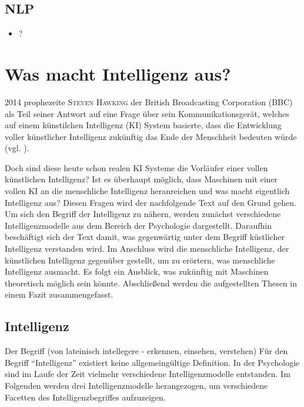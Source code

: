 \documentclass[a4paper, 11pt]{scrartcl}
\begin{document}
\subsection{NLP}
\begin{itemize}
  \item ?
\end{itemize}

\newpage

\section{Was macht Intelligenz aus?}

2014 prophezeite \textsc{Steven Hawking} der British Broadcasting Corporation (BBC) als Teil seiner Antwort auf eine Frage über sein Kommunikationsgerät, welches auf einem künstilchen Intelligenz (KI) System basierte, dass die Entwicklung voller künstlicher Intelligenz zukünftig das Ende der Menschheit bedeuten würde (vgl. \cite{BBC2014}).

Doch sind diese heute schon realen KI Systeme die Vorläufer einer vollen künstlichen Intelligenz? Ist es überhaupt möglich, dass Maschinen mit einer vollen KI an die menschliche Intelligenz heranreichen und was macht eigentlich Intelligenz aus? Diesen Fragen wird der nachfolgende Text auf den Grund gehen. Um sich den Begriff der Intelligenz zu nähern, werden zunächst verschiedene Intelligenzmodelle aus dem Bereich der Psychologie dargestellt. Daraufhin beschäftigt sich der Text damit, was gegenwärtig unter dem Begriff küstlicher Intelligenz verstanden wird. Im Anschluss wird die menschliche Intelligenz, der künstlichen Intelligenz gegenüber gestellt, um zu erörtern, was menschliche Intelligenz ausmacht. Es folgt ein Ausblick, was zukünftig mit Maschinen theoretisch möglich sein könnte. Abschließend werden die aufgestellten Thesen in einem Fazit zusammengefasst.

\subsection{Intelligenz}
Der Begriff (von lateinisch intellegere - erkennen, einsehen, verstehen)
Für den Begriff ``Intelligenz'' existiert keine allgemeingültige Definition. In der Psychologie sind im Laufe der Zeit vielmehr verschiedene Intelligenzmodelle entstanden. Im Folgenden werden drei Intelligenzmodelle herangezogen, um verschiedene Facetten des Intelligenzbegriffes aufzuzeigen.
\end{document}
